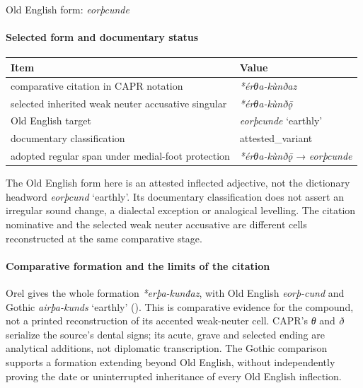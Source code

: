 \documentclass[
  british,
  a4paper,
]{article}
\newcounter{none} %
\begin{document}
Old English form: \emph{eorþcunde}

\paragraph{Selected form and documentary
status}\label{selected-form-and-documentary-status}

{\def\LTcaptype{none} %
\begin{longtable}[]{@{}
  >{\raggedright\arraybackslash}p{}
  >{\raggedright\arraybackslash}p{}@{}}
\toprule\noalign{}
\begin{minipage}[b]{\linewidth}\raggedright
Item
\end{minipage} & \begin{minipage}[b]{\linewidth}\raggedright
Value
\end{minipage} \\
\midrule\noalign{}
\endhead
\bottomrule\noalign{}
\endlastfoot
comparative citation in CAPR notation & \emph{*érθa-kùnðaz} \\
selected inherited weak neuter accusative singular &
\emph{*érθa-kùnðǭ} \\
Old English target & \emph{eorþcunde} `earthly' \\
documentary classification & attested\_variant \\
adopted regular span under medial-foot protection & \emph{*érθa-kùnðǭ} →
\emph{eorþcunde} \\
\end{longtable}
}

The Old English form here is an attested inflected adjective, not the
dictionary headword \emph{eorþcund} `earthly'. Its documentary
classification does not assert an irregular sound change, a dialectal
exception or analogical levelling. The citation nominative and the
selected weak neuter accusative are different cells reconstructed at the
same comparative stage.

\paragraph{Comparative formation and the limits of the
citation}\label{comparative-formation-and-the-limits-of-the-citation}

Orel gives the whole formation \emph{*erþa-kunđaz}, with Old English
\emph{eorþ-cund} and Gothic \emph{airþa-kunds} `earthly'
(). This is comparative evidence
for the compound, not a printed reconstruction of its accented
weak-neuter cell. CAPR's \emph{θ} and \emph{ð} serialize the source's
dental signs; its acute, grave and selected ending are analytical
additions, not diplomatic transcription. The Gothic comparison supports
a formation extending beyond Old English, without independently proving
the date or uninterrupted inheritance of every Old English inflection.
\end{document}
